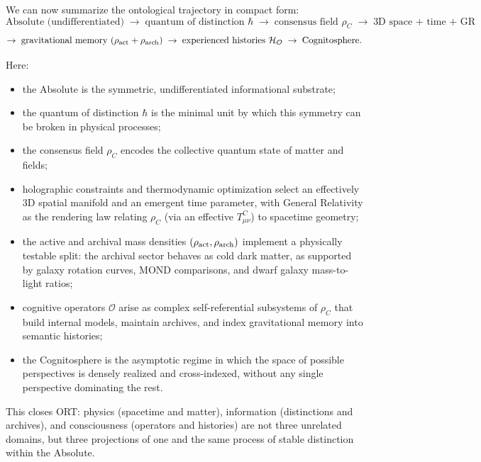 \documentclass[12pt,a4paper]{article}
\begin{document}
We can now summarize the ontological trajectory in compact form:
\begin{equation*}
  \text{Absolute (undifferentiated)}
  \;\to\;
  \text{quantum of distinction } \hbar
  \;\to\;
  \text{consensus field } \rho_C
  \;\to\;
  \text{3D space + time + GR}
\end{equation*}
\begin{equation*}
  \to\;
  \text{gravitational memory } (\rho_{\rm act} + \rho_{\rm arch})
  \;\to\;
  \text{experienced histories } \mathcal{H}_{\mathcal{O}}
  \;\to\;
  \text{Cognitosphere}.
\end{equation*}

Here:
\begin{itemize}
  \item the Absolute is the symmetric, undifferentiated informational substrate;
  \item the quantum of distinction $\hbar$ is the minimal unit by which this symmetry can be broken in physical processes;
  \item the consensus field $\rho_C$ encodes the collective quantum state of matter and fields;
  \item holographic constraints and thermodynamic optimization select an effectively 3D spatial manifold and an emergent time parameter, with General Relativity as the rendering law relating $\rho_C$ (via an effective $T^C_{\mu\nu}$) to spacetime geometry;
  \item the active and archival mass densities $(\rho_{\rm act}, \rho_{\rm arch})$ implement a physically testable split: the archival sector behaves as cold dark matter, as supported by galaxy rotation curves, MOND comparisons, and dwarf galaxy mass-to-light ratios;
  \item cognitive operators $\mathcal{O}$ arise as complex self-referential subsystems of $\rho_C$ that build internal models, maintain archives, and index gravitational memory into semantic histories;
  \item the Cognitosphere is the asymptotic regime in which the space of possible perspectives is densely realized and cross-indexed, without any single perspective dominating the rest.
\end{itemize}

This closes ORT: physics (spacetime and matter), information (distinctions and archives), and consciousness (operators and histories) are not three unrelated domains, but three projections of one and the same process of stable distinction within the Absolute.
\end{document}
